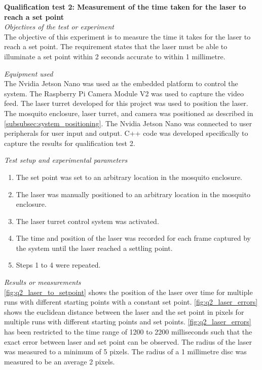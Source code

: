 \FloatBarrier
\textbf{Qualification test 2: Measurement of the time taken for the laser to reach a set point}\\

\textit{Objectives of the test or experiment}\\
The objective of this experiment is to measure the time it takes for the laser to reach a set point. The requirement states that the laser must be able to illuminate a set point within 2 seconds accurate to within 1 millimetre.

\textit{Equipment used}\\
The Nvidia Jetson Nano was used as the embedded platform to control the system. The Raspberry Pi Camera Module V2 was used to capture the video feed. The laser turret developed for this project was used to position the laser. The mosquito enclosure, laser turret, and camera was positioned as described in \autoref{subsubsec:system_positioning}. The Nvidia Jetson Nano was connected to user peripherals for user input and output. C++ code was developed specifically to capture the results for qualification test 2.

\textit{Test setup and experimental parameters}
\begin{enumerate}
  \item The set point was set to an arbitrary location in the mosquito enclosure.
  \item The laser was manually positioned to an arbitrary location in the mosquito enclosure.
  \item The laser turret control system was activated.
  \item The time and position of the laser was recorded for each frame captured by the system until the laser reached a settling point.
  \item Steps 1 to 4 were repeated.
\end{enumerate}

\textit{Results or measurements}\\
\autoref{fig:q2_laser_to_setpoint} shows the position of the laser over time for multiple runs with different starting points with a constant set point. \autoref{fig:q2_laser_errors} shows the euclidean distance between the laser and the set point in pixels for multiple runs with different starting points and set points. \autoref{fig:q2_laser_errors} has been restricted to the time range of 1200 to 2200 milliseconds such that the exact error between laser and set point can be observed. The radius of the laser was measured to a minimum of 5 pixels. The radius of a 1 millimetre disc was measured to be an average 2 pixels.

